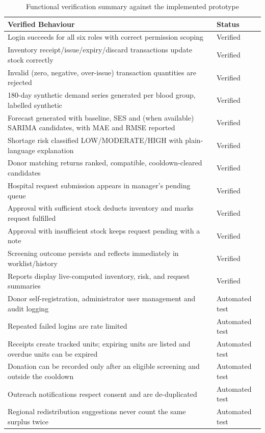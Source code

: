 \documentclass[12pt,a4paper,twoside]{report}
\begin{document}
\begin{table}[H]\centering
\begin{tabular}{@{}>{\raggedright}p{}>{\raggedright\arraybackslash}p{}@{}}
\toprule
\textbf{Verified Behaviour} & \textbf{Status}\\\midrule
Login succeeds for all six roles with correct permission scoping & Verified\\
Inventory receipt/issue/expiry/discard transactions update stock correctly & Verified\\
Invalid (zero, negative, over-issue) transaction quantities are rejected & Verified\\
180-day synthetic demand series generated per blood group, labelled synthetic & Verified\\
Forecast generated with baseline, SES and (when available) SARIMA candidates, with MAE and RMSE reported & Verified\\
Shortage risk classified LOW/MODERATE/HIGH with plain-language explanation & Verified\\
Donor matching returns ranked, compatible, cooldown-cleared candidates & Verified\\
Hospital request submission appears in manager's pending queue & Verified\\
Approval with sufficient stock deducts inventory and marks request fulfilled & Verified\\
Approval with insufficient stock keeps request pending with a note & Verified\\
Screening outcome persists and reflects immediately in worklist/history & Verified\\
Reports display live-computed inventory, risk, and request summaries & Verified\\
Donor self-registration, administrator user management and audit logging & Automated test\\
Repeated failed logins are rate limited & Automated test\\
Receipts create tracked units; expiring units are listed and overdue units can be expired & Automated test\\
Donation can be recorded only after an eligible screening and outside the cooldown & Automated test\\
Outreach notifications respect consent and are de-duplicated & Automated test\\
Regional redistribution suggestions never count the same surplus twice & Automated test\\
\bottomrule
\end{tabular}
\caption{Functional verification summary against the implemented prototype}\label{tab:verify}
\end{table}
\end{document}
